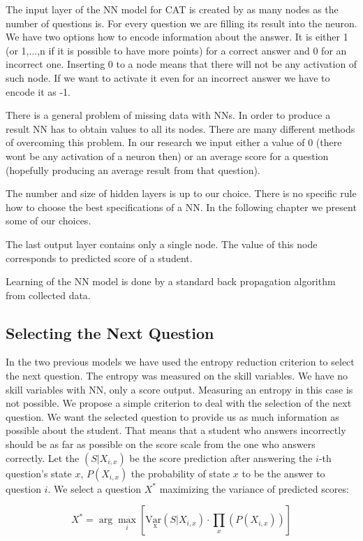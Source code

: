 The input layer of the NN model for CAT is created by as many nodes as the number of questions is. For every question we are filling its result into the neuron. We have two options how to encode information about the answer. It is either 1 (or 1,...,n if it is possible to have more points) for a correct answer and 0 for an incorrect one. Inserting 0 to a node means that there will not be any activation of such node. If we want to activate it even for an incorrect answer we have to encode it as -1. 

There is a general problem of missing data with NNs. In order to produce a result NN has to obtain values to all its nodes. There are many different methods of overcoming this problem. In our research we input either a value of 0 (there wont be any activation of a neuron then) or an average score for a question (hopefully producing an average result from that question).

The number and size of hidden layers is up to our choice. There is no specific rule how to choose the best specifications of a NN. In the following chapter we present some of our choices.

The last output layer contains only a single node. The value of this node corresponds to predicted score of a student.

Learning of the NN model is done by a standard back propagation algorithm from collected data.

\subsection{Selecting the Next Question}
In the two previous models we have used the entropy reduction criterion to select the next question. The entropy was measured on the skill variables. We have no skill variables with NN, only a score output. Measuring an entropy in this case is not possible. We propose a simple criterion to deal with the selection of the next question. We want the selected question to provide us as much information as possible about the student. That means that a student who answers incorrectly should be as far as possible on the score scale from the one who answers correctly. Let the $(S|X_{i,x})$ be the score prediction after answering the $i$-th question's state $x$, $P(X_{i,x})$ the probability of state $x$ to be the answer to question $i$. We select a question $X^*$ maximizing the variance of predicted scores:

$$X^* = \arg\max_i \left[ \mathrm{V\underset{x}ar} (S|X_{i,x}) \cdot \prod_x (P(X_{i,x})) \right] $$

